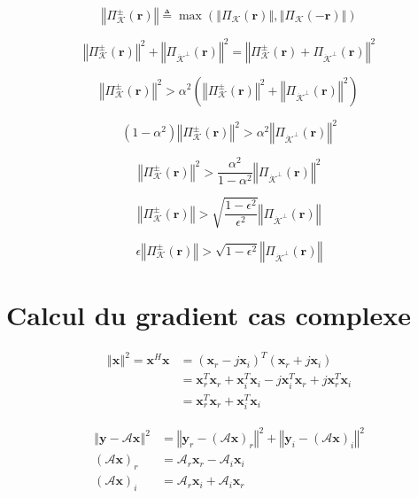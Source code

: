\documentclass{article}
\renewcommand{\vec}[1]{\ensuremath{\bm{#1}}}
\newcommand{\y}{\vec{y}}
\newcommand{\dico}{\ensuremath{\mathcal{A}}}
\newcommand{\x}{\vec{x}}
\renewcommand{\r}{\vec{r}}
\newcommand{\cone}{\ensuremath{\mathcal{K}}}
\newcommand{\norm}[1]{\ensuremath{\left\Vert#1\right\Vert}}
\newcommand{\projPM}[2]{\ensuremath{\Pi^\pm_{#1}(#2)}}
\newcommand{\proj}[2]{\ensuremath{\Pi_{#1}(#2)}}
\newcommand{\projOrth}[2]{\ensuremath{\Pi_{#1^\perp}(#2)}}
\begin{document}
	
	\begin{equation*}
		\norm{\projPM{\cone}{\r}} \triangleq \max\left(\norm{\proj{\cone}{\r}},\norm{\proj{\cone}{-\r}}\right)
	\end{equation*}
	
	\begin{equation*}
		\norm{\projPM{\cone}{\r}}^2+\norm{\projOrth{\dot{\cone}}{\r}}^2=\norm{\projPM{\cone}{\r}+\projOrth{\dot{\cone}}{\r}}^2
	\end{equation*}
	
	\begin{equation*}
	\norm{\projPM{\cone}{\r}}^2>\alpha^2\left(\norm{\projPM{\cone}{\r}}^2+\norm{\projOrth{\dot{\cone}}{\r}}^2\right)
	\end{equation*}
	
	\begin{equation*}
	(1-\alpha^2)\norm{\projPM{\cone}{\r}}^2>\alpha^2\norm{\projOrth{\dot{\cone}}{\r}}^2
	\end{equation*}
	
	\begin{equation*}
	\norm{\projPM{\cone}{\r}}^2>\frac{\alpha^2}{1-\alpha^2}\norm{\projOrth{\dot{\cone}}{\r}}^2
	\end{equation*}
	
	\begin{equation*}
	\norm{\projPM{\cone}{\r}}>\sqrt{\frac{1-\epsilon^2}{\epsilon^2}}\norm{\projOrth{\dot{\cone}}{\r}}
	\end{equation*}
	
	\begin{equation*}
	\epsilon\norm{\projPM{\cone}{\r}}>\sqrt{1-\epsilon^2}\norm{\projOrth{\dot{\cone}}{\r}}
	\end{equation*}
	
	\section*{Calcul du gradient cas complexe}
	
	\begin{align*}
		\norm{\x}^2=\x^H\x & = (\x_r-j\x_i)^T(\x_r+j\x_i) \\
						   & = \x_r^T\x_r+\x_i^T\x_i-j\x_i^T\x_r+j\x_r^T\x_i\\
						   & = \x_r^T\x_r+\x_i^T\x_i
	\end{align*}
	
	\begin{align*}
		\norm{\y-\dico\x}^2 & =\norm{\y_r-(\dico\x)_r}^2+\norm{\y_i-(\dico\x)_i}^2\\
		(\dico\x)_r & = \dico_r\x_r-\dico_i\x_i\\
		(\dico\x)_i & = \dico_r\x_i+\dico_i\x_r
	\end{align*}
	
\end{document}
